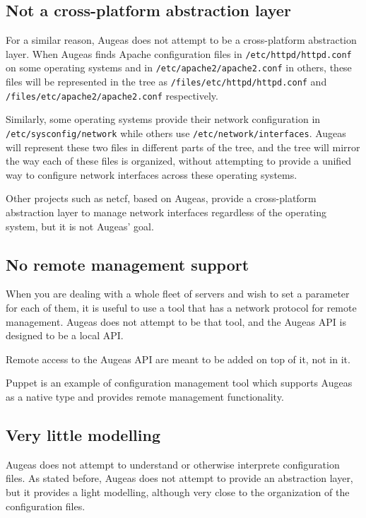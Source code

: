 \subsection{Not a cross-platform abstraction layer}

For a similar reason, Augeas does not attempt to be a cross-platform abstraction layer. When Augeas finds Apache configuration files in \verb!/etc/httpd/httpd.conf! on some operating systems and in \verb!/etc/apache2/apache2.conf! in others, these files will be represented in the tree as \verb!/files/etc/httpd/httpd.conf! and \verb!/files/etc/apache2/apache2.conf! respectively.

Similarly, some operating systems provide their network configuration in \verb!/etc/sysconfig/network! while others use \verb!/etc/network/interfaces!. Augeas will represent these two files in different parts of the tree, and the tree will mirror the way each of these files is organized, without attempting to provide a unified way to configure network interfaces across these operating systems.

Other projects such as netcf, based on Augeas, provide a cross-platform abstraction layer to manage network interfaces regardless of the operating system, but it is not Augeas' goal.

\subsection{No remote management support}

When you are dealing with a whole fleet of servers and wish to set a parameter for each of them, it is useful to use a tool that has a network protocol for remote management. Augeas does not attempt to be that tool, and the Augeas API is designed to be a local API.

Remote access to the Augeas API are meant to be added on top of it, not in it.

Puppet is an example of configuration management tool which supports Augeas as a native type and provides remote management functionality.

\subsection{Very little modelling}

Augeas does not attempt to understand or otherwise interprete configuration files. As stated before, Augeas does not attempt to provide an abstraction layer, but it provides a light modelling, although very close to the organization of the configuration files.

